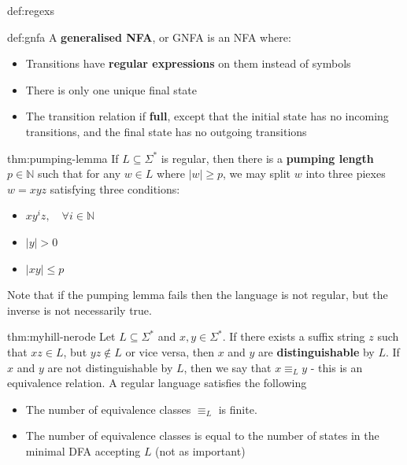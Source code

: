 \documentclass[landscape, 8pt]{extarticle}
\begin{document}
\begin{multicols}{3}
\begin{dfn}{def:regexs}{}
\end{dfn}


\begin{dfn}{def:gnfa}{}
A \textbf{generalised NFA}, or GNFA is an NFA where:
\renewcommand\labelitemi{\tiny$\bullet$}
\begin{itemize}
    \setlength\itemsep{0em}
    \item Transitions have \textbf{regular expressions} on them instead of symbols
    \item There is only one unique final state
    \item The transition relation if \textbf{full}, except that the initial state has no incoming transitions, and the final state has no outgoing transitions
\end{itemize}
\end{dfn}


\begin{thm}{thm:pumping-lemma}{}
If $L\subseteq \Sigma^{*}$ is regular, then there is a \textbf{pumping length} $p\in\mathbb{N}$ such that for any $w\in L$ where $\lvert w\rvert \ge p$, we may split $w$ into three piexes $w=xyz$ satisfying three conditions:
\renewcommand\labelitemi{\tiny$\bullet$}
\begin{itemize}
    \setlength\itemsep{0em}
    \item $xy^{i}z,\quad \forall i\in \mathbb{N}$
    \item $\lvert y\rvert > 0$
    \item $\lvert xy\rvert \le p$
\end{itemize}
Note that if the pumping lemma fails then the language is not regular, but the inverse is not necessarily true.
\end{thm}

\begin{thm}{thm:myhill-nerode}{}
Let $L\subseteq \Sigma^{*}$ and $x,y\in \Sigma^{*}$. If there exists a suffix string $z$ such that $xz\in L$, but $yz \not\in L$ or vice versa, then $x$ and $y$ are \textbf{distinguishable} by $L$.
If $x$ and $y$ are not distinguishable by $L$, then we say that $x \equiv_{L} y$ - this is an equivalence relation. A regular language satisfies the following
\renewcommand\labelitemi{\tiny$\bullet$}
\begin{itemize}
    \setlength\itemsep{0em}
    \item The number of equivalence classes $\equiv_{L}$ is finite.
    \item The number of equivalence classes is equal to the number of states in the minimal DFA accepting $L$ (not as important)
\end{itemize}


\end{thm}
\end{multicols}
\end{document}
